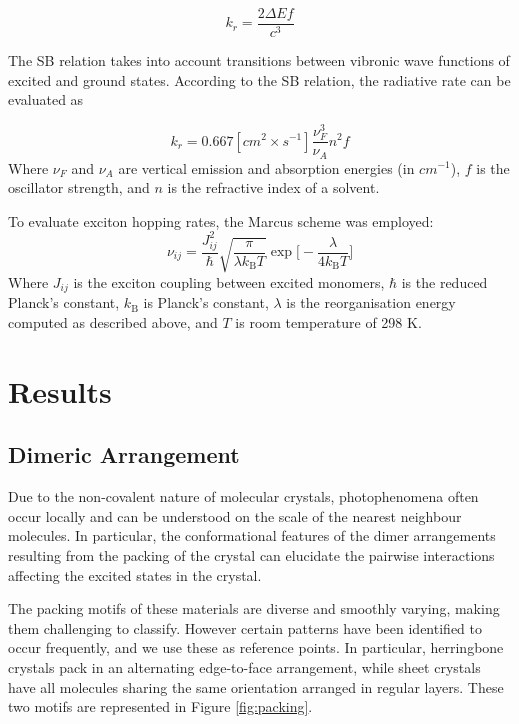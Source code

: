 \begin{equation}
k_r=\frac{2\Delta E f}{c^3}
\label{eq1}
\end{equation}

The SB relation takes into account transitions between vibronic wave functions of excited and ground states\cite{SBrelation}. According to the SB relation, the radiative rate can be evaluated as\cite{Shi2017}

\begin{equation}
k_r=0.667 [cm^2 \times s^{-1}] \frac{\nu_F^3}{\nu_A}n^2 f
\label{eq2}
\end{equation}
Where $\nu_F$ and $\nu_A$ are vertical emission and absorption energies (in $cm^{-1}$), $f$ is the oscillator strength, and $n$ is the refractive index of a solvent.



To evaluate exciton hopping rates, the Marcus scheme was employed:
\begin{equation}
\nu_{ij}=\frac{J_{ij}^2}{\hbar}\sqrt{\frac{\pi}{\lambda k_{\text{B}}T}}\exp\bigg[-\frac{\lambda}{4k_{\text{{B}}}T}\bigg]
\label{eq:marcus}
\end{equation}
Where $J_{ij}$ is the exciton coupling between excited monomers, $\hbar$ is the reduced Planck's constant, $k_\text{B}$ is Planck's constant, $\lambda$ is the reorganisation energy computed as described above, and $T$ is room temperature of 298 K.\cite{Stehr2014,Kimura2000}
\section{Results}

\subsection{Dimeric Arrangement}
Due to the non-covalent nature of molecular crystals, photophenomena often occur locally\cite{Arag2015} and can be understood on the scale of the nearest neighbour molecules. In particular, the conformational features of the dimer arrangements resulting from the packing of the crystal can elucidate the pairwise interactions affecting the excited states in the crystal.

The packing motifs of these materials are diverse and smoothly varying, making them challenging to classify. However certain patterns have been identified to occur frequently, and we use these as reference points.\cite{Desiraju1989,Campbell2017} In particular, herringbone crystals pack in an alternating edge-to-face arrangement, while sheet crystals have all molecules sharing the same orientation arranged in regular layers. These two motifs are represented in Figure \ref{fig:packing}. 

